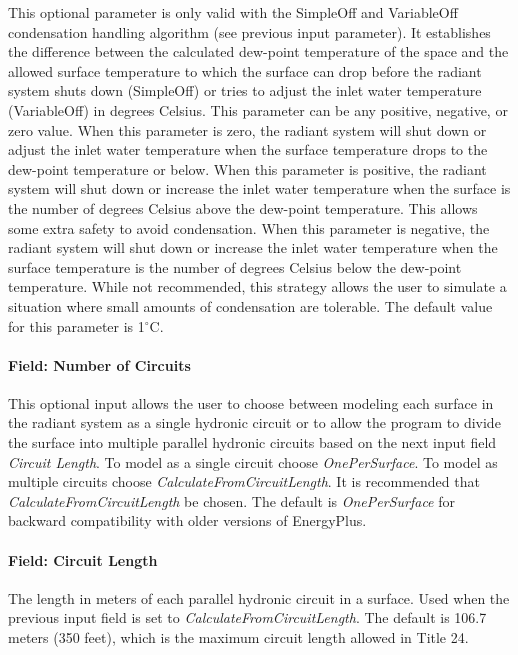 This optional parameter is only valid with the SimpleOff and VariableOff condensation handling algorithm (see previous input parameter). It establishes the difference between the calculated dew-point temperature of the space and the allowed surface temperature to which the surface can drop before the radiant system shuts down (SimpleOff) or tries to adjust the inlet water temperature (VariableOff) in degrees Celsius. This parameter can be any positive, negative, or zero value. When this parameter is zero, the radiant system will shut down or adjust the inlet water temperature when the surface temperature drops to the dew-point temperature or below. When this parameter is positive, the radiant system will shut down or increase the inlet water temperature when the surface is the number of degrees Celsius above the dew-point temperature. This allows some extra safety to avoid condensation. When this parameter is negative, the radiant system will shut down or increase the inlet water temperature when the surface temperature is the number of degrees Celsius below the dew-point temperature. While not recommended, this strategy allows the user to simulate a situation where small amounts of condensation are tolerable. The default value for this parameter is 1$^\circ$C.

\paragraph{Field: Number of Circuits}\label{field-number-of-circuits-1}

This optional input allows the user to choose between modeling each surface in the radiant system as a single hydronic circuit or to allow the program to divide the surface into multiple parallel hydronic circuits based on the next input field \emph{Circuit Length}. To model as a single circuit choose \emph{OnePerSurface}. To model as multiple circuits choose \emph{CalculateFromCircuitLength}. It is recommended that \emph{CalculateFromCircuitLength} be chosen. The default is \emph{OnePerSurface} for backward compatibility with older versions of EnergyPlus.

\paragraph{Field: Circuit Length}\label{field-circuit-length-1}

The length in meters of each parallel hydronic circuit in a surface. Used when the previous input field is set to \emph{CalculateFromCircuitLength}. The default is 106.7 meters (350 feet), which is the maximum circuit length allowed in Title 24.

